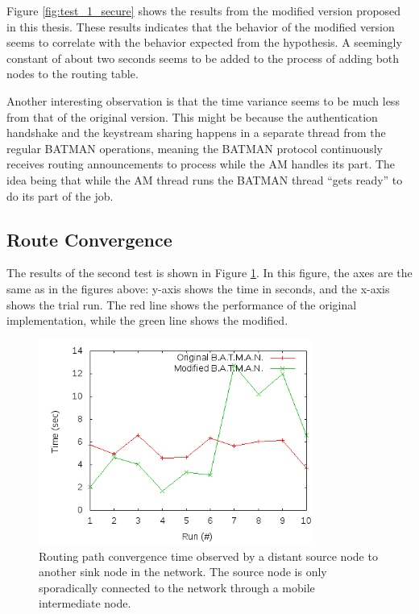 Figure \ref{fig:test_1_secure} shows the results from the modified version
proposed in this thesis. These results indicates that the behavior of the
modified version seems to correlate with the behavior expected from the
hypothesis. A seemingly constant of about two seconds seems to be added to the
process of adding both nodes to the routing table. 

Another interesting observation is that the time variance seems to be much less
from that of the original version. This might be because the authentication
handshake and the keystream sharing happens in a separate thread from the
regular BATMAN operations, meaning the BATMAN protocol continuously receives
routing announcements to process while the \ac{AM} handles its part. The idea
being that while the \ac{AM} thread runs the BATMAN thread ``gets ready'' to do
its part of the job.

\subsection{Route Convergence}
The results of the second test is shown in Figure \ref{fig:results_test_2}. In
this figure, the axes are the same as in the figures above: y-axis shows the
time in seconds, and the x-axis shows the trial run. The red line shows the
performance of the original implementation, while the green line shows the
modified.

\begin{figure}[h]
	\centering
	\includegraphics[width=0.8\textwidth]{images/test_2.png}
	\caption{Routing path convergence time observed by a distant source node to another sink node in the network. The source node is only sporadically connected to the network through a mobile intermediate node.}
	\label{fig:results_test_2}
\end{figure}

